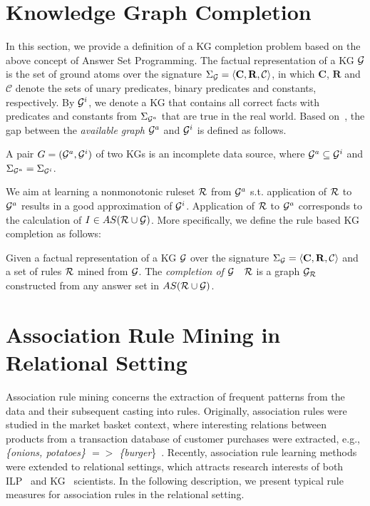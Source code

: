\section{Knowledge Graph Completion}

In this section, we provide a definition of a KG completion problem based on the above concept of Answer Set Programming. The factual representation of a KG $\mathcal{G}$ is the set of ground atoms over the signature $\Sigma_{\mathcal{G}}=\langle\mathbf{C},\mathbf{R},\mathcal{C}\rangle$, in which $\mathbf{C}$, $\mathbf{R}$ and $\mathcal{C}$ denote the sets of unary predicates, binary predicates and constants, respectively. By $\mathcal{G}^i$, we denote a KG that contains all correct facts with predicates and constants from $\Sigma_{\mathcal{G}^a}$ that are true in the real world. Based on~\cite{ref51}, the gap between the \emph{available graph} $\mathcal{G}^a$ and $\mathcal{G}^i$ is defined as follows.

\begin{definition} A pair $G = (\mathcal{G}^a, \mathcal{G}^i)$ of two KGs is an incomplete data source, where $\mathcal{G}^a\subseteq \mathcal{G}^i$ and $\Sigma_{\mathcal{G}^a}=\Sigma_{\mathcal{G}^i}$.
\end{definition}

We aim at learning a nonmonotonic ruleset $\mathcal{R}$ from $\mathcal{G}^a$ s.t. application of $\mathcal{R}$ to $\mathcal{G}^a$ results in a good approximation of $\mathcal{G}^i$. Application of $\mathcal{R}$ to $\mathcal{G}^a$ corresponds to the calculation of $I \in AS(\mathcal{R} \cup \mathcal{G})$. More specifically, we define the rule based KG completion as follows:

\begin{definition}\label{def:graphcompl}
Given a factual representation of a KG $\mathcal{G}$ over the signature $\Sigma_{\mathcal{G}}=\langle\mathbf{C},\mathbf{R},\mathcal{C}\rangle$ and a set of rules $\mathcal{R}$ mined from $\mathcal{G}$. The \emph{completion of $\mathcal{G}$ \wrt\ $\mathcal{R}$} is a graph $\mathcal{G}_{\mathcal{R}}$ constructed from any answer set in $AS(\mathcal{R} \cup \mathcal{G})$.
\end{definition}

\section{Association Rule Mining in Relational Setting}

Association rule mining concerns the extraction of frequent patterns from the data and their subsequent casting into rules. Originally, association rules were studied in the market basket context, where interesting relations between products from a transaction database of customer purchases were extracted, e.g., \textit{\{onions, potatoes\} $=>$ \{burger}\}~\cite{ref54}. Recently, association rule learning methods were extended to relational settings, which attracts research interests of both ILP~\cite{ref52} and KG~\cite{ref10} scientists. In the following description, we present typical rule measures for association rules in the relational setting.

